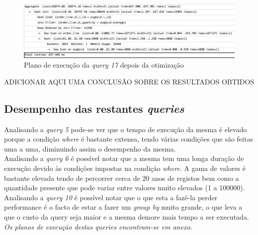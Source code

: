 \begin{figure}[h!]
\centering
\includegraphics[width=\textwidth]{img/00_query17_pos}
\caption{Plano de execução da \textit{query 17} depois da otimização \label{overflow}}
\end{figure}

ADICIONAR AQUI UMA CONCLUSÃO SOBRE OS RESULTADOS OBTIDOS

\newpage

\subsection{Desempenho das restantes \textit{queries}}

Analisando a \textit{query 5} pode-se ver que o tempo de execução da mesma é elevado porque a condição \textit{where} é bastante extensa, tendo várias condições que são feitas uma a uma, diminuindo assim o desempenho da mesma.\\

Analisando a \textit{query 6} é possível notar que a mesma tem uma longa duração de execução devido às condições impostas na condição \textit{where}. A gama de valores é bastante elevada tendo de percorrer cerca de 20 anos de registos bem como a quantidade presente que pode variar entre valores muito elevados (1 a 100000).\\

Analisando a \textit{query 10} é possível notar que o que esta a fazê-la perder performance é o facto de estar a fazer um \textit{group by} muito grande, o que leva a que o custo da query seja maior e a mesma demore mais tempo a ser executada.\\

\textit{Os planos de execução destas queries encontram-se em anexo.}
